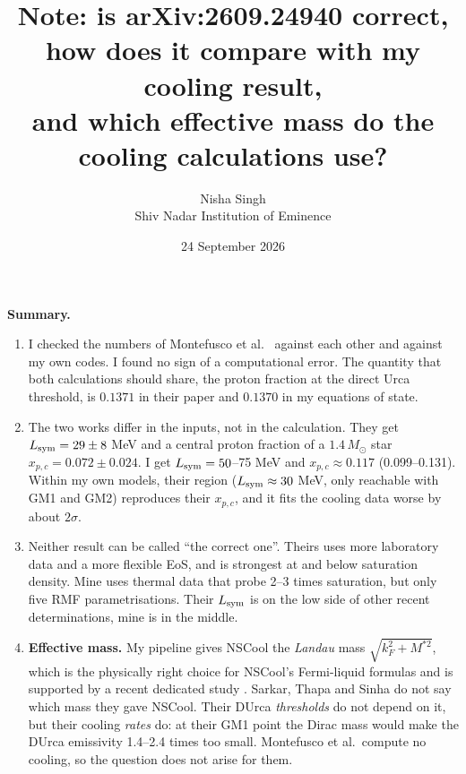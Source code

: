\documentclass[11pt,a4paper]{article}
\title{Note: is arXiv:2609.24940 correct, how does it compare with my cooling result,\\ and which effective mass do the cooling calculations use?}
\author{Nisha Singh\\ Shiv Nadar Institution of Eminence}
\date{24 September 2026}
\newcommand{\Lsym}{L_{\rm sym}}
\newcommand{\Msun}{M_\odot}
\begin{document}
\sloppy
\maketitle

\noindent\textbf{Summary.}
\begin{enumerate}
\item I checked the numbers of Montefusco et al.\ \cite{Montefusco2026} against each other and against my own codes. I found no sign of a computational error. The quantity that both calculations should share, the proton fraction at the direct Urca threshold, is $0.1371$ in their paper and $0.1370$ in my equations of state.
\item The two works differ in the inputs, not in the calculation. They get $\Lsym=29\pm8$ MeV and a central proton fraction of a $1.4\,\Msun$ star $x_{p,c}=0.072\pm0.024$. I get $\Lsym=50$--75 MeV and $x_{p,c}\approx0.117$ (0.099--0.131). Within my own models, their region ($\Lsym\approx30$ MeV, only reachable with GM1 and GM2) reproduces their $x_{p,c}$, and it fits the cooling data worse by about $2\sigma$.
\item Neither result can be called ``the correct one''. Theirs uses more laboratory data and a more flexible EoS, and is strongest at and below saturation density. Mine uses thermal data that probe 2--3 times saturation, but only five RMF parametrisations. Their $\Lsym$ is on the low side of other recent determinations, mine is in the middle.
\item \textbf{Effective mass.} My pipeline gives NSCool the \emph{Landau} mass $\sqrt{k_F^2+M^{*2}}$, which is the physically right choice for NSCool's Fermi-liquid formulas and is supported by a recent dedicated study \cite{SugiyamaDohi2026}. Sarkar, Thapa and Sinha \cite{Sarkar2023} do not say which mass they gave NSCool. Their DUrca \emph{thresholds} do not depend on it, but their cooling \emph{rates} do: at their GM1 point the Dirac mass would make the DUrca emissivity 1.4--2.4 times too small. Montefusco et al.\ compute no cooling, so the question does not arise for them.
\end{enumerate}

\end{document}
